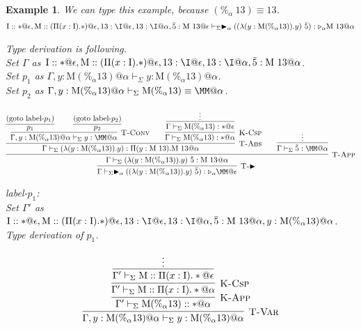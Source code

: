 \documentclass[9pt, a4paper]{extarticle}
\theoremstyle{break}
\newtheorem{ex}{Example}
\newcommand{\G}{\Gamma}
\newcommand{\V}{\vdash_\Sigma}
\newcommand{\TW}{\triangleright}
\newcommand{\TB}{\blacktriangleright}
\newcommand{\E}{\equiv}
\begin{document}
	\begin{ex}
		\newcommand{\M}{\textrm{M}}
		\newcommand{\MM}{\textrm{M}\ 13}
		\newcommand{\I}{\textrm{I}}
		We can type this example, because $(\%_\alpha\ 13) \E 13$.\\
		\begin{align*}
			\I::*@\epsilon,\M::(\Pi (x:\I).*)@\epsilon,13:\I@\epsilon,13:\I@\alpha,\bar{5}:\M\ 13@\epsilon\V\TB_\alpha ((\lambda (y:\M (\%_\alpha 13)).y)\ \bar{5}):\TW_\alpha \M\ 13@\alpha
		\end{align*}

		Type derivation is following.\\
		Set $\G$ as $\I::*@\epsilon,\M::(\Pi (x:\I).*)@\epsilon,13:\I@\epsilon,13:\I@\alpha,\bar{5}:\M\ 13@\alpha$.\\
		Set $p_1$ as $\G,y:\M (\%_\alpha 13)@\alpha \V y:\M (\%_\alpha 13)@\alpha$.\\
		Set $p_2$ as $\G,y:\M (\%_\alpha 13)@\alpha \V \M (\%_\alpha 13)\E\MM@\alpha$.
		\begin{center}
			$$
				\infer[\textsc{T-$\TB$}]
				{\G\V\TB_\alpha ((\lambda (y:\M (\%_\alpha 13)).y)\ \bar{5}):\TW_\alpha \MM@\epsilon}
				{
					\infer[\textsc{T-App}]
						{\G\V (\lambda (y:\M (\%_\alpha 13)).y)\ \bar{5}:\M\ 13@\alpha}
						{
							\infer[\textsc{T-Abs}]
						{\G\V (\lambda (y:\M (\%_\alpha 13)).y):\Pi (y:\MM).\M\ 13@\alpha}
						{
							\infer[\textsc{T-Conv}]
							{\G,y:\M (\%_\alpha 13)@\alpha \V y:\MM@\alpha}
							{\infer[]{p_1}{\textrm{(goto label-$p_1$)}} \andalso \infer[]{p_2}{\textrm{(goto label-$p_2$)}}}
							\andalso
							\infer[\textsc{K-Csp}]
							{\G\V \M (\%_\alpha 13):*@\alpha}
							{
								\infer[]
									{\G\V \M (\%_\alpha 13):*@\epsilon}
									{\vdots}
							}
						}
							\andalso
							\infer[]
							{\G\V \bar{5}:\MM@\alpha}
							{\vdots}
						}
				}
			$$
		\end{center}
		label-$p_1$:\\
		Set $\G'$ as $\I::*@\epsilon,\M::(\Pi (x:\I).*)@\epsilon,13:\I@\epsilon,13:\I@\alpha,\bar{5}:\M\ 13@\alpha,y:\M (\%_\alpha 13)@\alpha$.\\
		Type derivation of $p_1$.
		\begin{center}
			$$
				\infer[\textsc{T-Var}]
				{\G,y:\M (\%_\alpha 13)@\alpha \V y:\M (\%_\alpha 13)@\alpha}
				{
					\infer[\textsc{K-App}]
					{\G' \V \M (\%_\alpha 13)::*@\alpha}
					{
						\infer[\textsc{K-Csp}]
						{\G'\V \M::\Pi (x:\I).*@\alpha}
						{
							\infer[]
							{\G'\V \M::\Pi (x:\I).*@\epsilon}
							{\vdots}
}}}$$
\end{center}
\end{ex}
\end{document}
